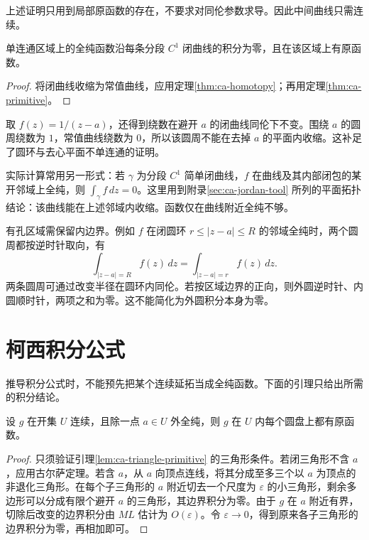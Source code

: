 \documentclass[UTF8,12pt,a4paper,fontset=fandol]{ctexbook}
\begin{document}
上述证明只用到局部原函数的存在，不要求对同伦参数求导。因此中间曲线只需连续。

\begin{corollary}
\label{cor:ca-cauchy-simply-connected}
单连通区域上的全纯函数沿每条分段 $C^1$ 闭曲线的积分为零，且在该区域上有原函数。
\end{corollary}
\begin{proof}
将闭曲线收缩为常值曲线，应用定理\ref{thm:ca-homotopy}；再用定理\ref{thm:ca-primitive}。
\end{proof}

取 $f(z)=1/(z-a)$，还得到绕数在避开 $a$ 的闭曲线同伦下不变。围绕 $a$ 的圆周绕数为 $1$，常值曲线绕数为 $0$，所以该圆周不能在去掉 $a$ 的平面内收缩。这补足了圆环与去心平面不单连通的证明。

实际计算常用另一形式：若 $\gamma$ 为分段 $C^1$ 简单闭曲线，$f$ 在曲线及其内部闭包的某开邻域上全纯，则 $\int_\gamma f\,dz=0$。这里用到附录\ref{sec:ca-jordan-tool} 所列的平面拓扑结论：该曲线能在上述邻域内收缩。函数仅在曲线附近全纯不够。

有孔区域需保留内边界。例如 $f$ 在闭圆环 $r\le|z-a|\le R$ 的邻域全纯时，两个圆周都按逆时针取向，有
\[
 \int_{|z-a|=R}f(z)\,dz=\int_{|z-a|=r}f(z)\,dz.
\]
两条圆周可通过改变半径在圆环内同伦。若按区域边界的正向，则外圆逆时针、内圆顺时针，两项之和为零。这不能简化为外圆积分本身为零。

\section{柯西积分公式}

推导积分公式时，不能预先把某个连续延拓当成全纯函数。下面的引理只给出所需的积分结论。

\begin{lemma}
\label{lem:ca-one-exception}
设 $g$ 在开集 $U$ 连续，且除一点 $a\in U$ 外全纯，则 $g$ 在 $U$ 内每个圆盘上都有原函数。
\end{lemma}
\begin{proof}
只须验证引理\ref{lem:ca-triangle-primitive} 的三角形条件。若闭三角形不含 $a$，应用古尔萨定理。若含 $a$，从 $a$ 向顶点连线，将其分成至多三个以 $a$ 为顶点的非退化三角形。在每个子三角形的 $a$ 附近切去一个尺度为 $\varepsilon$ 的小三角形，剩余多边形可以分成有限个避开 $a$ 的三角形，其边界积分为零。由于 $g$ 在 $a$ 附近有界，切除后改变的边界积分由 $ML$ 估计为 $O(\varepsilon)$。令 $\varepsilon\to0$，得到原来各子三角形的边界积分为零，再相加即可。
\end{proof}
\end{document}
